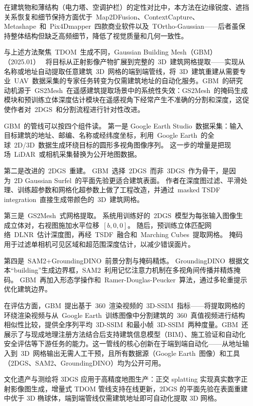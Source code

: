 在建筑物和薄结构（电力塔、空调护栏）的定性对比中，本方法在边缘锐度、遮挡关系恢复和细节保持方面优于~Map2DFusion、ContextCapture、Metashape~和~Pix4Dmapper~四款商业软件以及~TOrtho-Gaussian——后者虽保持整体结构但缺乏高频细节，降低了视觉质量和几何一致性。

与上述方法聚焦~TDOM~生成不同，Gaussian Building Mesh（GBM）（2025.01）~\cite{2501_00625} 将目标从正射影像产物扩展到完整的~3D~建筑网格提取——实现从名称或地址自动提取任意建筑~3D~网格的端到端管线，将~3D~建筑重建从需要专业~UAV~数据采集的专家任务转变为仅需建筑地址的自动化服务。GBM~的研究动机源于~GS2Mesh~在遥感建筑提取场景中的系统性失效：GS2Mesh~的掩码生成模块和预训练立体深度估计模块在遥感视角下经常产生不准确的分割和深度，这促使作者对~2DGS~和分割流程进行针对性改进。

GBM~的管线可以按四个组件读。
第一是 Google Earth Studio~数据采集：输入目标建筑的地址、邮编、名称或经纬度坐标，利用~Google Earth~的全球~2D/3D~数据生成环绕目标的圆形多视角图像序列。
这一步的增量是把现场~LiDAR~或相机采集替换为公开地图数据。

第二是改进的~2DGS~重建。
GBM~选择~2DGS~而非~3DGS~作为骨干，是因为~2D Gaussian Surfel~的平面先验更适合建筑表面。
作者在深度图过滤、平滑处理、训练超参数和网格化超参数上做了工程改造，并通过~masked TSDF integration~直接生成带颜色的~3D~建筑网格。

第三是~GS2Mesh~式网格提取。
系统用训练好的~2DGS~模型为每张输入图像生成立体对，右视图施加水平位移~$[b,0,0]$。
随后，预训练立体匹配网络~DLNR~估计深度图，再经~TSDF~融合和~Marching Cubes~提取网格。
掩码用于过滤单相机可见区域和超范围深度估计，以减少错误面片。

第四是~SAM2+GroundingDINO~前景分割与掩码精炼。
GroundingDINO~根据文本“building”生成边界框，SAM2~利用记忆注意力机制在多视角间传播并精炼掩码。
GBM~再加入形态学操作和~Ramer-Douglas-Peucker~算法，通过多轮重提示优化建筑边界。

在评估方面，GBM~提出基于~360\textdegree~渲染视频的~3D-SSIM~指标——将提取网格的环绕渲染视频与从~Google Earth~训练图像中分割建筑的~360\textdegree~真值视频进行结构相似性比较，提供全序列平均~3D-SSIM~和最小帧~3D-SSIM~两种度量。GBM~还展示了与现成地理注册方法结合后支持建筑信息模型（BIM）、施工验证和自动化安全评估等下游任务的能力。这一管线的核心创新在于端到端自动化——从地址输入到~3D~网格输出无需人工干预，且所有数据源（Google Earth~图像）和工具（2DGS、SAM2、GroundingDINO）均为公开可用。

\begin{takeaway}
文化遗产与测绘将 3DGS 应用于高精度地图生产：正交 splatting 实现真实数字正射影像图生成，增量式 TDOM 管线支持在线更新，2DGS 的平面先验在表面重建中优于 3D 椭球体，端到端管线仅需建筑地址即可自动化提取 3D 网格。
\end{takeaway}

